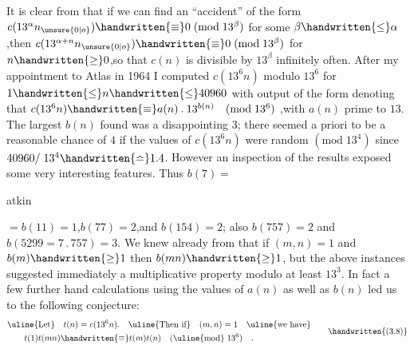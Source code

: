 It is clear from  that if we can find an ``accident'' of the form $c(13^{\alpha}n_{\unsure{0|o}})\handwritten{\equiv}0\;(\mathrm{mod}\;13^{\beta})$ for some $\beta\handwritten{\leq}\alpha$,then $c(13^{\alpha+n}n_{\unsure{0|o}})\handwritten{\equiv}0\;(\mathrm{mod}\;13^{\beta})$ for $n\handwritten{\geq}0$,so that \uline{$c(n)$} is divisible by $13^{\beta}$ infinitely often. After my appointment to Atlas in 1964 I computed \uline{$c(13^{6}n)$} modulo $13^{6}$ for $1\handwritten{\leq}n\handwritten{\leq}40960$ with output of the form
denoting that $c(13^{6}n)\handwritten{\equiv}a(n)\mathbin{.}13^{b(n)}\quad(\mathrm{mod}\;13^{6})$ ,with \uline{$a(n)$} prime to $13$. The largest $b(n)$ found was a disappointing $3$; there seemed a priori to be a reasonable chance of $4$ if the values of \uline{$c(13^{6}n)$} were random $(\mathrm{mod}\;13^{4})$ since $40960/\;13^{4}\handwritten{\bumpeq}1.4$. However an inspection of the results exposed some very interesting features. Thus $b(7)=$\ \parbox[c]{12mm}{}

\noindent\hfill atkin  

\noindent $=b(11)=1$,$b(77)=2$,and $b(154)=2$; also $b(757)=2$ and $b(5299=7\mathbin{.}757)=3$. We knew already from  that if $(m,n)=1$ and $b(m)\handwritten{\geq}1$ then $b(mn)\handwritten{\geq}1$, but the above instances suggested immediately a multiplicative property modulo at least $13^{3}$. In fact a few further hand calculations using the values of $a(n)$ as well as $b(n)$ led us to the following conjecture:
\[
\begin{aligned}
&\text{\uline{Let}}\quad t(n)=c(13^{6}n).\quad \text{\uline{Then if}}\quad (m,n)=1\quad\text{\uline{we have}}\\
&\qquad t(1)t(mn)\handwritten{\equiv}t(m)t(n)\quad(\text{\uline{mod}}\;13^{6})\quad .
\end{aligned}
\tag*{\handwritten{(3.8)}}
\]

